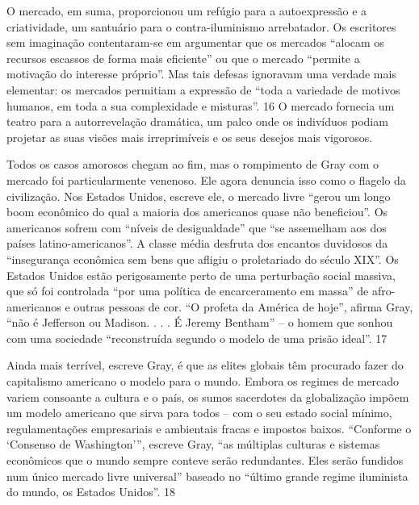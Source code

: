 \par
 
O mercado, em suma, proporcionou um refúgio para a autoexpressão e a criatividade, um santuário para o contra-iluminismo arrebatador. Os escritores sem imaginação contentaram-se em argumentar que os mercados “alocam os recursos escassos de forma mais eficiente” ou que o mercado “permite a motivação do interesse próprio”. Mas tais defesas ignoravam uma verdade mais elementar: os mercados permitiam a expressão de “toda a variedade de motivos humanos, em toda a sua complexidade e misturas”.
 {\color{blue} 16}  
O mercado fornecia um teatro para a autorrevelação dramática, um palco onde os indivíduos podiam projetar as suas visões mais irreprimíveis e os seus desejos mais vigorosos.
 
\par
 
Todos os casos amorosos chegam ao fim, mas o rompimento de Gray com o mercado foi particularmente venenoso. Ele agora denuncia isso como o flagelo da civilização. Nos Estados Unidos, escreve ele, o mercado livre “gerou um longo boom econômico do qual a maioria dos americanos quase não beneficiou”. Os americanos sofrem com “níveis de desigualdade” que “se assemelham aos dos países latino-americanos”. A classe média desfruta dos encantos duvidosos da “insegurança econômica sem bens que afligiu o proletariado do século XIX”. Os Estados Unidos estão perigosamente perto de uma perturbação social massiva, que só foi controlada “por uma política de encarceramento em massa” de afro-americanos e outras pessoas de cor. “O profeta da América de hoje”, afirma Gray, “não é Jefferson ou Madison. . . . É Jeremy Bentham” – o homem que sonhou com uma sociedade “reconstruída segundo o modelo de uma prisão ideal”.
 {\color{blue} 17}  

 
\par
 
Ainda mais terrível, escreve Gray, é que as elites globais têm procurado fazer do capitalismo americano o modelo para o mundo. Embora os regimes de mercado variem consoante a cultura e o país, os sumos sacerdotes da globalização impõem um modelo americano que sirva para todos – com o seu estado social mínimo, regulamentações empresariais e ambientais fracas e impostos baixos. “Conforme o ‘Consenso de Washington’”, escreve Gray, “as múltiplas culturas e sistemas econômicos que o mundo sempre conteve serão redundantes. Eles serão fundidos num único mercado livre universal” baseado no “último grande regime iluminista do mundo, os Estados Unidos”.
 {\color{blue} 18}  

